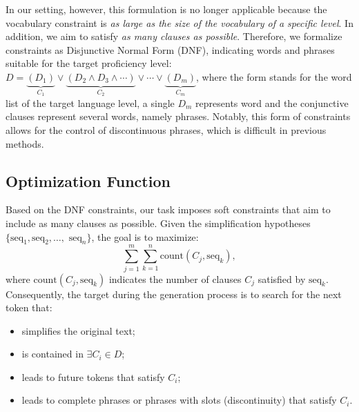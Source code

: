 In our setting, however, this formulation is no longer applicable because the vocabulary constraint is \emph{as large as the size of the vocabulary of a specific level}. 
In addition, we aim to satisfy \emph{as many clauses as possible}. 
Therefore, we formalize constraints as Disjunctive Normal Form (DNF), indicating words and phrases suitable for the target proficiency level: $D = \underbrace{(D_1)}_{C_1} \lor \underbrace{(D_2 \land D_3 \land \cdots )}_{C_2} \lor \cdots \lor \underbrace{(D_m)}_{C_m}$, where the form stands for the word list of the target language level, a single $D_m$ represents word and the conjunctive clauses represent several words, namely phrases. 
Notably, this form of constraints allows for the control of discontinuous phrases, which is difficult in previous methods. 

\subsection{Optimization Function}
Based on the DNF constraints, our task imposes soft constraints that aim to include as many clauses as possible. 
Given the simplification hypotheses $\{ \text{seq}_1, \text{seq}_2, \ldots,\text{ seq}_n \}$, the goal is to maximize:
\begin{equation}\label{eq:goal}
    \sum_{j=1}^{m} \sum_{k=1}^{n} \text{count}(C_j, \text{seq}_k),
\end{equation}
where $\text{count}(C_j,  \text{seq}_k)$ indicates the number of clauses $C_j$ satisfied by $ \text{seq}_k$. 
Consequently, the target during the generation process is to search for the next token that: 

\begin{itemize}[noitemsep,topsep=1pt,parsep=0pt,partopsep=0pt,]
 
    \item simplifies the original text;
    \item is contained in $\exists C_i \in D$; 
    \item leads to future tokens that satisfy $C_i$; 
    \item leads to complete phrases or phrases with slots (discontinuity) that satisfy $C_i$.
\end{itemize}


